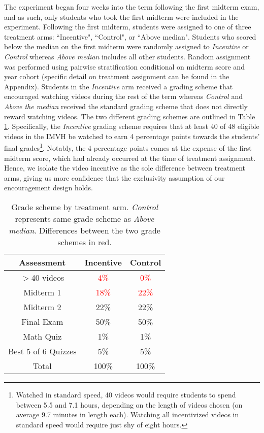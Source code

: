 \documentclass[12pt]{article}
\newcommand{\red}[1]{\textcolor{red}{#1}}
\begin{document}
The experiment began four weeks into the term following the first midterm exam, and as such, only students who took the first midterm were included in the experiment. Following the first midterm, students were assigned to one of three treatment arms: ``Incentive", ``Control", or ``Above median". Students who scored below the median on the first midterm were randomly assigned to \textit{Incentive} or \textit{Control} whereas \textit{Above median} includes all other students. Random assignment was performed using pairwise stratification conditional on midterm score and year cohort (specific detail on treatment assignment can be found in the Appendix). Students in the \textit{Incentive} arm received a grading scheme that encouraged watching videos during the rest of the term whereas \textit{Control} and \textit{Above the median} received the standard grading scheme that does not directly reward watching videos. The two different grading schemes are outlined in Table \ref{gradescheme}. Specifically, the \textit{Incentive} grading scheme requires that at least 40 of 48 eligible videos in the IMVH be watched to earn 4 percentage points towards the students' final grades\footnote{Watched in standard speed, 40 videos would require students to spend between 5.5 and 7.1 hours, depending on the length of videos chosen (on average 9.7 minutes in length each). Watching all incentivized videos in standard speed would require just shy of eight hours.}.
Notably, the 4 percentage points comes at the expense of the first midterm score, which had already occurred at the time of treatment assignment. Hence, we isolate the video incentive as the sole difference between treatment arms, giving us more confidence that the exclusivity assumption of our encouragement design holds. %

\begin{table}
	\caption{Grade scheme by treatment arm. \textit{Control} represents same grade scheme as \textit{Above median}. Differences between the two grade schemes in red.}
	\centering
	\begin{tabular}{ c|c|c } 
		Assessment & Incentive & Control \\
		\hline
		$>$40 videos & \red{4\%} & \red{0\%} \\ 
		Midterm 1 & \red{18\%} & \red{22\%} \\ 
		Midterm 2 & 22\% & 22\% \\ 
		Final Exam & 50\% & 50\% \\ 
		Math Quiz & 1\% & 1\% \\ 
		Best 5 of 6 Quizzes & 5\% & 5\% \\ 
		\hline
		Total & 100\% & 100\% \\
	\end{tabular} 
	\label{gradescheme}
\end{table}
\end{document}
